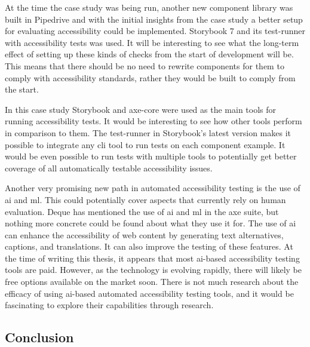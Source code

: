 \documentclass{master_thesis}
\begin{document}
At the time the case study was being run, another new component library was built in Pipedrive and with the initial insights from the case study a better setup for evaluating accessibility could be implemented. Storybook 7 and its test-runner with accessibility tests was used. It will be interesting to see what the long-term effect of setting up these kinds of checks from the start of development will be. This means that there should be no need to rewrite components for them to comply with accessibility standards, rather they would be built to comply from the start.

In this case study Storybook and axe-core were used as the main tools for running accessibility tests. It would be interesting to see how other tools perform in comparison to them. The test-runner in Storybook's latest version makes it possible to integrate any \ac{cli} tool to run tests on each component example. It would be even possible to run tests with multiple tools to potentially get better coverage of all automatically testable accessibility issues.

Another very promising new path in automated accessibility testing is the use of \ac{ai} and \ac{ml}. This could potentially cover aspects that currently rely on human evaluation. Deque has mentioned the use of \ac{ai} and \ac{ml} in the axe suite, but nothing more concrete could be found about what they use it for. The use of \ac{ai} can enhance the accessibility of web content by generating text alternatives, captions, and translations. It can also improve the testing of these features. At the time of writing this thesis, it appears that most \ac{ai}-based accessibility testing tools are paid. However, as the technology is evolving rapidly, there will likely be free options available on the market soon. There is not much research about the efficacy of using \ac{ai}-based automated accessibility testing tools, and it would be fascinating to explore their capabilities through research.

\subsection{Conclusion}
\end{document}
